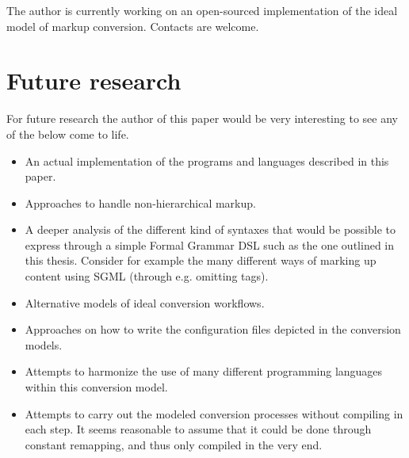 \documentclass{scrreprt}
\begin{document}
The author is currently working on an open-sourced implementation of the ideal model of markup conversion. Contacts are welcome.







\section{Future research}
For future research the author of this paper would be very interesting to see any of the below come to life.

\begin{itemize}
\item An actual implementation of the programs and languages described in this paper.
\item Approaches to handle non-hierarchical markup.
\item A deeper analysis of the different kind of syntaxes that would be possible to express through a simple Formal Grammar DSL such as the one outlined in this thesis. Consider for example the many different ways of marking up content using SGML (through e.g. omitting tags).
\item Alternative models of ideal conversion workflows.
\item Approaches on how to write the configuration files depicted in the conversion models.
\item Attempts to harmonize the use of many different programming languages within this conversion model.
\item Attempts to carry out the modeled conversion processes without compiling in each step. It seems reasonable to assume that it could be done through constant remapping, and thus only compiled in the very end.
\end{itemize}















%
%
%
%
%
%



\end{document}
